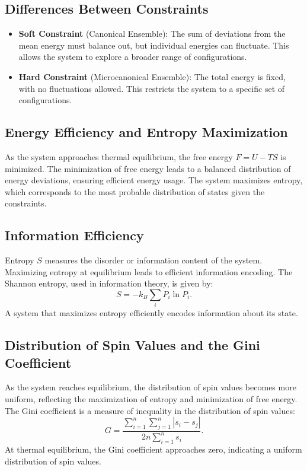 \documentclass{article}
\begin{document}
\subsection{Differences Between Constraints}
\begin{itemize}
    \item \textbf{Soft Constraint} (Canonical Ensemble): The sum of deviations from the mean energy must balance out, but individual energies can fluctuate. This allows the system to explore a broader range of configurations.
    \item \textbf{Hard Constraint} (Microcanonical Ensemble): The total energy is fixed, with no fluctuations allowed. This restricts the system to a specific set of configurations.
\end{itemize}

\subsection{Energy Efficiency and Entropy Maximization}

As the system approaches thermal equilibrium, the free energy \( F = U - TS \) is minimized. The minimization of free energy leads to a balanced distribution of energy deviations, ensuring efficient energy usage. The system maximizes entropy, which corresponds to the most probable distribution of states given the constraints.

\subsection{Information Efficiency}

Entropy \( S \) measures the disorder or information content of the system. Maximizing entropy at equilibrium leads to efficient information encoding. The Shannon entropy, used in information theory, is given by:
\begin{equation}
S = -k_B \sum_i P_i \ln P_i.
\end{equation}
A system that maximizes entropy efficiently encodes information about its state.

\subsection{Distribution of Spin Values and the Gini Coefficient}

As the system reaches equilibrium, the distribution of spin values becomes more uniform, reflecting the maximization of entropy and minimization of free energy. The Gini coefficient is a measure of inequality in the distribution of spin values:
\begin{equation}
G = \frac{\sum_{i=1}^{n} \sum_{j=1}^{n} |s_i - s_j|}{2n \sum_{i=1}^{n} s_i}.
\end{equation}
At thermal equilibrium, the Gini coefficient approaches zero, indicating a uniform distribution of spin values.
\end{document}

